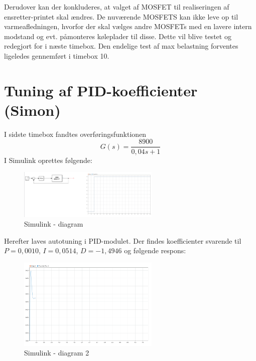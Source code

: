Derudover kan der konkluderes, at valget af MOSFET til realiseringen af ensretter-printet skal ændres. De nuværende MOSFETS kan ikke leve op til varmeafledningen, hvorfor der skal vælges andre MOSFETs med en lavere intern modstand og evt. påmonteres køleplader til disse. 
Dette vil blive testet og redegjort for i næste timebox. Den endelige test af max belastning forventes ligeledes gennemført i timebox 10. 
    
\clearpage

\section{Tuning af PID-koefficienter (Simon)}
\label{sec:tuning-af-pid}

I sidste timebox fandtes overføringsfunktionen
\begin{equation}
  \label{eq:1}
G(s) = \frac{8900}{0,04s+1}  
\end{equation}
I Simulink oprettes følgende:

\begin{figure}[h]
  \centering
  \includegraphics[width=0.6\textwidth]{sbil1.png}
  \caption{Simulink - diagram}
  \label{fig:sbil1}
\end{figure}

Herefter laves autotuning i PID-modulet. Der findes koefficienter svarende til $P=0,0010$, $I=0,0514$, $D=-1,4946$ og følgende respons:

\begin{figure}[h]
  \centering
  \includegraphics[width=0.6\textwidth]{sbil2.png}
  \caption{Simulink - diagram 2}
  \label{fig:sbil1}
\end{figure}

